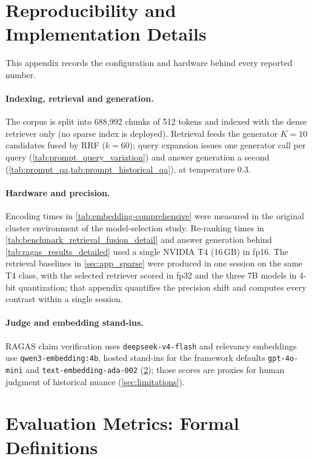 \documentclass[11pt]{article}
\begin{document}
\section{Reproducibility and Implementation Details}
\label{sec:app_impl}

This appendix records the configuration and hardware behind every reported number.

\paragraph{Indexing, retrieval and generation.} The corpus is split into 688{,}992 chunks of 512 tokens and indexed with the dense retriever only (no sparse index is deployed). Retrieval feeds the generator \(K=10\) candidates fused by RRF (\(k=60\)); query expansion issues one generator call per query (\cref{tab:prompt_query_variation}) and answer generation a second (\cref{tab:prompt_qa,tab:prompt_historical_qa}), at temperature 0.3.

\paragraph{Hardware and precision.} Encoding times in \cref{tab:embedding-comprehensive} were measured in the original cluster environment of the model-selection study. Re-ranking times in \cref{tab:benchmark_retrieval_fusion_detail} and answer generation behind \cref{tab:ragas_results_detailed} used a single NVIDIA T4 (16\,GB) in fp16. The retrieval baselines in \cref{sec:app_sparse} were produced in one session on the same T4 class, with the selected retriever scored in fp32 and the three 7B models in 4-bit quantization; that appendix quantifies the precision shift and computes every contrast within a single session.

\paragraph{Judge and embedding stand-ins.} RAGAS claim verification uses \texttt{deepseek-v4-flash} and relevancy embeddings use \texttt{qwen3-embedding:4b}, hosted stand-ins for the framework defaults \texttt{gpt-4o-mini} and \texttt{text-embedding-ada-002} (\cref{sec:app_metrics}); those scores are proxies for human judgment of historical nuance (\cref{sec:limitations}).


\section{Evaluation Metrics: Formal Definitions}
\label{sec:app_metrics}
\end{document}
